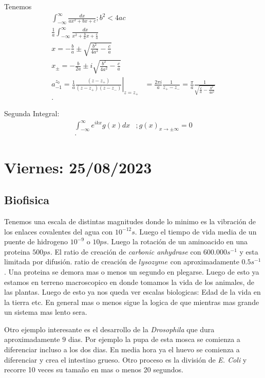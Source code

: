 \documentclass{report}
\begin{document}
  Tenemos
  \begin{align*}
    \int_{-\infty}^{\infty}\frac{dx}{ax^2+bx+c}; b^2<4ac\\
    \frac{1}{a}\int_{-\infty}^{\infty}\frac{dx}{x^2+\frac{b}{a}x+\frac{c}{a}}\\
    x = -\frac{b}{a}\pm\sqrt{\frac{b^2}{4a^2} - \frac{c}{a}}\\
    x_{\pm} = -\frac{b}{2a}\pm i\sqrt{\frac{b^2}{4a^2}-\frac{c}{a}} \\
    a_{-1}^{z_0} = \left.\frac{1}{a}\frac{\left( z-z_{+} \right) }{\left( z-z_{+} \right) \left( z-z_{-} \right) }\right|_{z=z_{+}}
      &= \frac{2\pi i}{a}\frac{1}{z_{+}-z_{-}} = \frac{\pi}{a}\frac{1}{\sqrt{\frac{c}{a}-\frac{b^2}{4a^2}} } \\
  .\end{align*}

  Segunda Integral:
  \begin{align*}
    \int_{-\infty}^{\infty}e^{ikx}g\left( x \right) dx &; g\left( x \right)_{x\to \pm\infty}=0\\
  .\end{align*}
  \chapter{Viernes: 25/08/2023}
  \section{Biofisica}

  Tenemos una escala de distintas magnitudes donde lo minimo es la vibración de los enlaces covalentes del agua con $10^{-12}s$. Luego el tiempo de vida media de un puente de hidrogeno $10^{-9}$ o $10 ps$. Luego la rotación de un aminoacido en una proteina $500 ps$. El ratio de creación de \textit{carbonic anhydrase} con $600.000 s^{-1}$ y esta limitada por difusión. ratio de creación de $lysozyme$ con aproximadamente $0.5 s^{-1}$. Una proteina se demora mas o menos un segundo en plegarse. Luego de esto ya estamos en terreno macroscopico en donde tomamos la vida de los animales, de las plantas. Luego de esto ya nos queda ver escalas biologicas: Edad de la vida en la tierra etc. En general mas o menos sigue la logica de que mientras mas grande un sistema mas lento sera.

  Otro ejemplo interesante es el desarrollo de la \textit{Drosophila} que dura aproximadamente $9$ dias. Por ejemplo la pupa de esta mosca se comienza a diferenciar incluso a los dos dias. En media hora ya el huevo se comienza a diferenciar y crea el intestino grueso.  Otro proceso es la división de \textit{E. Coli} y recorre 10 veces su tamaño en mas o menos 20 segundos.
\end{document}
